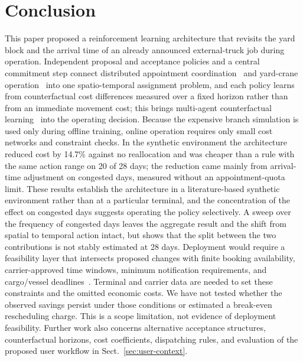 \documentclass[a4paper]{llncs}
\begin{document}
\section{Conclusion}
\label{sec:concl}
This paper proposed a reinforcement learning architecture that revisits
the yard block and the arrival time of an already announced
external-truck job during operation. Independent proposal and acceptance
policies and a central commitment step connect distributed appointment
coordination~\cite{ref6} and yard-crane operation~\cite{ref7,ref8} into
one spatio-temporal assignment problem, and each policy learns from
counterfactual cost differences measured over a fixed horizon rather
than from an immediate movement cost; this brings multi-agent
counterfactual learning~\cite{ref10,ref11} into the operating decision.
Because the expensive branch simulation is used only during offline
training, online operation requires only small cost networks and
constraint checks. In the synthetic environment the architecture reduced
cost by 14.7\% against no reallocation and was cheaper than a rule with
the same action range on 20 of 28 days; the reduction came mainly from
arrival-time adjustment on congested days, measured without an
appointment-quota limit.
These results establish the architecture in a literature-based synthetic
environment rather than at a particular terminal, and the concentration
of the effect on congested days suggests operating the policy
selectively. A sweep over the frequency of congested
days leaves the aggregate result and the shift from spatial to temporal
action intact, but shows that the split between the two contributions is
not stably estimated at 28 days. Deployment would require a feasibility layer that intersects proposed
changes with finite booking availability, carrier-approved time
windows, minimum notification requirements, and cargo/vessel
deadlines~\cite{ref4,ref6,refquota}. Terminal and carrier data are needed
to set these constraints and the omitted economic costs. We have not
tested whether the observed savings persist under those conditions
or estimated a break-even rescheduling charge. This is a scope
limitation, not evidence of deployment feasibility. Further work
also concerns alternative acceptance structures, counterfactual
horizons, cost coefficients, dispatching rules, and evaluation of
the proposed user workflow in Sect.~\ref{sec:user-context}.
\end{document}

